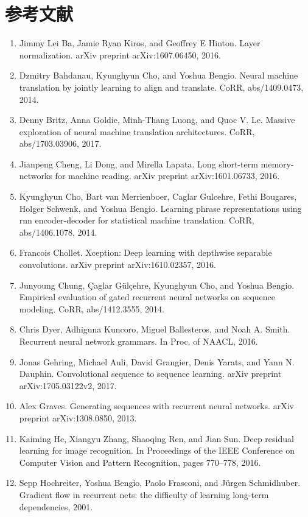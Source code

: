 \documentclass[11pt,UTF8,fontset=fandol]{ctexart}
\begin{document}
\section*{参考文献}
\begin{enumerate}[leftmargin=2.4em,labelsep=0.6em,itemsep=0.15em]
\item Jimmy Lei Ba, Jamie Ryan Kiros, and Geoffrey E Hinton. Layer normalization. arXiv preprint arXiv:1607.06450, 2016.
\item Dzmitry Bahdanau, Kyunghyun Cho, and Yoshua Bengio. Neural machine translation by jointly learning to align and translate. CoRR, abs/1409.0473, 2014.
\item Denny Britz, Anna Goldie, Minh-Thang Luong, and Quoc V. Le. Massive exploration of neural machine translation architectures. CoRR, abs/1703.03906, 2017.
\item Jianpeng Cheng, Li Dong, and Mirella Lapata. Long short-term memory-networks for machine reading. arXiv preprint arXiv:1601.06733, 2016.
\item Kyunghyun Cho, Bart van Merrienboer, Caglar Gulcehre, Fethi Bougares, Holger Schwenk, and Yoshua Bengio. Learning phrase representations using rnn encoder-decoder for statistical machine translation. CoRR, abs/1406.1078, 2014.
\item Francois Chollet. Xception: Deep learning with depthwise separable convolutions. arXiv preprint arXiv:1610.02357, 2016.
\item Junyoung Chung, \c{C}aglar G\"ul\c{c}ehre, Kyunghyun Cho, and Yoshua Bengio. Empirical evaluation of gated recurrent neural networks on sequence modeling. CoRR, abs/1412.3555, 2014.
\item Chris Dyer, Adhiguna Kuncoro, Miguel Ballesteros, and Noah A. Smith. Recurrent neural network grammars. In Proc. of NAACL, 2016.
\item Jonas Gehring, Michael Auli, David Grangier, Denis Yarats, and Yann N. Dauphin. Convolutional sequence to sequence learning. arXiv preprint arXiv:1705.03122v2, 2017.
\item Alex Graves. Generating sequences with recurrent neural networks. arXiv preprint arXiv:1308.0850, 2013.
\item Kaiming He, Xiangyu Zhang, Shaoqing Ren, and Jian Sun. Deep residual learning for image recognition. In Proceedings of the IEEE Conference on Computer Vision and Pattern Recognition, pages 770--778, 2016.
\item Sepp Hochreiter, Yoshua Bengio, Paolo Frasconi, and J\"urgen Schmidhuber. Gradient flow in recurrent nets: the difficulty of learning long-term dependencies, 2001.

\end{enumerate}
\end{document}
